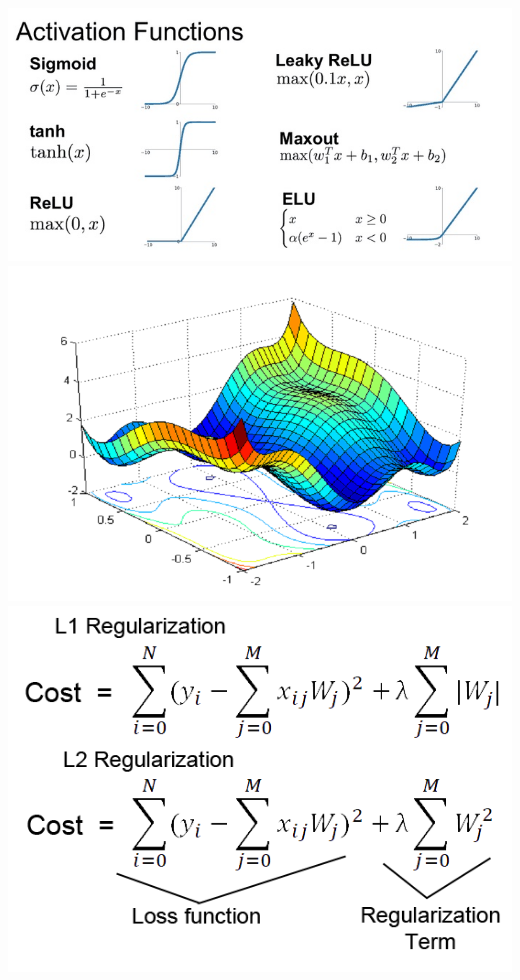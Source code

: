 \documentclass{beamer}
\begin{document}
\begin{frame}
			
	\begin{columns}[c]
		\centering
		\includegraphics[width=\textwidth]{5}
		\centering
		\includegraphics[width=\textwidth]{4}
		\centering
		\includegraphics[width=\textwidth]{6}
	\end{columns}
\end{frame}
	
\end{document}
